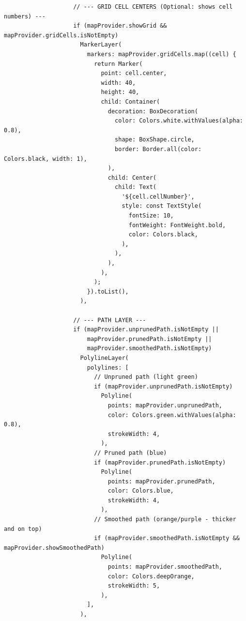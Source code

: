\begin{lstlisting}
                    // --- GRID CELL CENTERS (Optional: shows cell numbers) ---
                    if (mapProvider.showGrid && mapProvider.gridCells.isNotEmpty)
                      MarkerLayer(
                        markers: mapProvider.gridCells.map((cell) {
                          return Marker(
                            point: cell.center,
                            width: 40,
                            height: 40,
                            child: Container(
                              decoration: BoxDecoration(
                                color: Colors.white.withValues(alpha: 0.8),
                                shape: BoxShape.circle,
                                border: Border.all(color: Colors.black, width: 1),
                              ),
                              child: Center(
                                child: Text(
                                  '${cell.cellNumber}',
                                  style: const TextStyle(
                                    fontSize: 10,
                                    fontWeight: FontWeight.bold,
                                    color: Colors.black,
                                  ),
                                ),
                              ),
                            ),
                          );
                        }).toList(),
                      ),

                    // --- PATH LAYER ---
                    if (mapProvider.unprunedPath.isNotEmpty ||
                        mapProvider.prunedPath.isNotEmpty ||
                        mapProvider.smoothedPath.isNotEmpty)
                      PolylineLayer(
                        polylines: [
                          // Unpruned path (light green)
                          if (mapProvider.unprunedPath.isNotEmpty)
                            Polyline(
                              points: mapProvider.unprunedPath,
                              color: Colors.green.withValues(alpha: 0.8),
                              strokeWidth: 4,
                            ),
                          // Pruned path (blue)
                          if (mapProvider.prunedPath.isNotEmpty)
                            Polyline(
                              points: mapProvider.prunedPath,
                              color: Colors.blue,
                              strokeWidth: 4,
                            ),
                          // Smoothed path (orange/purple - thicker and on top)
                          if (mapProvider.smoothedPath.isNotEmpty && mapProvider.showSmoothedPath)
                            Polyline(
                              points: mapProvider.smoothedPath,
                              color: Colors.deepOrange,
                              strokeWidth: 5,
                            ),
                        ],
                      ),


\end{lstlisting}
